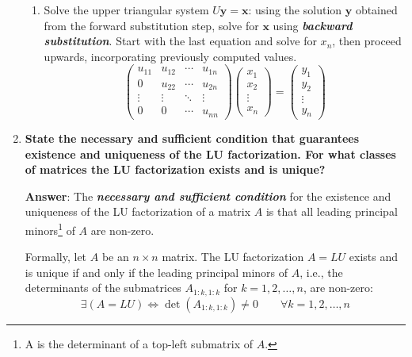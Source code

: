 \begin{enumerate}[label=\textcolor{Green3}{\textbf{\arabic*.}}]
\begin{enumerate}
        \item Solve the upper triangular system $U\mathbf{y} = \mathbf{x}$: using the solution $\mathbf{y}$ obtained from the forward substitution step, solve for $\mathbf{x}$ using \textbf{\emph{backward substitution}}. Start with the last equation and solve for $x_{n}$, then proceed upwards, incorporating previously computed values.
        \begin{equation*}
            \begin{pmatrix}
                u_{11} & u_{12} & \cdots & u_{1n} \\
                0      & u_{22} & \cdots & u_{2n} \\
                \vdots & \vdots & \ddots & \vdots \\
                0      & 0      & \cdots & u_{nn}
                \end{pmatrix}
                \begin{pmatrix}
                x_{1} \\ x_{2} \\ \vdots \\ x_{n}
                \end{pmatrix}
                =
                \begin{pmatrix}
                y_{1} \\ y_{2} \\ \vdots \\ y_{n}
            \end{pmatrix}
        \end{equation*}
    \end{enumerate}


    \newpage

    \item \textcolor{Green3}{\textbf{%
        State the necessary and sufficient condition that guarantees existence and uniqueness of the LU factorization. For what classes of matrices the LU factorization exists and is unique?
    }}

    \textbf{Answer}: The \textbf{\emph{necessary and sufficient condition}} for the existence and uniqueness of the LU factorization of a matrix $A$ is that all leading principal minors\footnote{A  is the determinant of a top-left submatrix of $A$.} of $A$ are non-zero.
    
    Formally, let $A$ be an $n \times n$ matrix. The LU factorization $A = LU$ exists and is unique if and only if the leading principal minors of $A$, i.e., the determinants of the submatrices $A_{1:k, 1:k}$ for $k = 1, 2, \ldots, n$, are non-zero:
    \begin{equation*}
        \exists\left(A = LU\right) \iff \det(A_{1:k, 1:k}) \neq 0 \hspace{2em} \forall k = 1, 2, \dots, n
    \end{equation*}


\end{enumerate}
